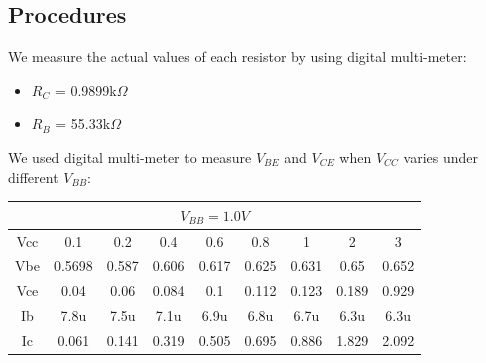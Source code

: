     \subsection{Procedures}
    We measure the actual values of each resistor by using digital multi-meter:\par
    \begin{itemize}
        \item $R_C$ = 0.9899k$\Omega$
        \item $R_B$ = 55.33k$\Omega$
    \end{itemize}
    We used digital multi-meter to measure $V_{BE}$ and $V_{CE}$ when $V_{CC}$ varies under different $V_{BB}$:\par
    \begin{table}[h]
    \centering
\begin{tabular}{|ccccccccc|}
\hline
\multicolumn{9}{|c|}{$V_{BB}=1.0V$}                                                                                                                                                                                                                     \\ \hline
\multicolumn{1}{|c|}{Vcc}     & \multicolumn{1}{c|}{0.1}    & \multicolumn{1}{c|}{0.2}    & \multicolumn{1}{c|}{0.4}    & \multicolumn{1}{c|}{0.6}    & \multicolumn{1}{c|}{0.8}    & \multicolumn{1}{c|}{1}      & \multicolumn{1}{c|}{2}     & 3      \\ \hline
\multicolumn{1}{|c|}{Vbe}     & \multicolumn{1}{c|}{0.5698} & \multicolumn{1}{c|}{0.587}  & \multicolumn{1}{c|}{0.606}  & \multicolumn{1}{c|}{0.617}  & \multicolumn{1}{c|}{0.625}  & \multicolumn{1}{c|}{0.631}  & \multicolumn{1}{c|}{0.65}  & 0.652  \\ \hline
\multicolumn{1}{|c|}{Vce}     & \multicolumn{1}{c|}{0.04}   & \multicolumn{1}{c|}{0.06}   & \multicolumn{1}{c|}{0.084}  & \multicolumn{1}{c|}{0.1}    & \multicolumn{1}{c|}{0.112}  & \multicolumn{1}{c|}{0.123}  & \multicolumn{1}{c|}{0.189} & 0.929  \\ \hline
\multicolumn{1}{|c|}{Ib}      & \multicolumn{1}{c|}{7.8u}   & \multicolumn{1}{c|}{7.5u}   & \multicolumn{1}{c|}{7.1u}   & \multicolumn{1}{c|}{6.9u}   & \multicolumn{1}{c|}{6.8u}   & \multicolumn{1}{c|}{6.7u}   & \multicolumn{1}{c|}{6.3u}  & 6.3u   \\ \hline
\multicolumn{1}{|c|}{Ic}      & \multicolumn{1}{c|}{0.061}  & \multicolumn{1}{c|}{0.141}  & \multicolumn{1}{c|}{0.319}  & \multicolumn{1}{c|}{0.505}  & \multicolumn{1}{c|}{0.695}  & \multicolumn{1}{c|}{0.886}  & \multicolumn{1}{c|}{1.829} & 2.092  \\ \hline

\end{tabular}
\end{table}
